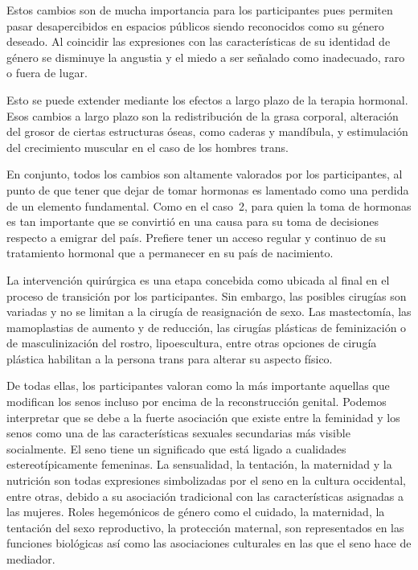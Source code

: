 Estos cambios son de mucha importancia para los participantes pues permiten
pasar desapercibidos en espacios públicos siendo reconocidos como su género
deseado. Al coincidir las expresiones con las características de su identidad de
género se disminuye la angustia y el miedo a ser señalado como inadecuado, raro
o fuera de lugar.

Esto se puede extender mediante los efectos a largo plazo de la terapia
hormonal. Esos cambios a largo plazo son la redistribución de la grasa corporal,
alteración del grosor de ciertas estructuras óseas, como caderas y mandíbula, y
estimulación del crecimiento muscular en el caso de los hombres trans.

En conjunto, todos los cambios son altamente valorados por los participantes, al
punto de que tener que dejar de tomar hormonas es lamentado como una perdida de
un elemento fundamental. Como en el caso~2, para quien la toma de hormonas es
tan importante que se convirtió en una causa para su toma de decisiones respecto
a emigrar del país. Prefiere tener un acceso regular y continuo de su
tratamiento hormonal que a permanecer en su país de nacimiento.

La intervención quirúrgica es una etapa concebida como ubicada al final en el
proceso de transición por los participantes. Sin embargo, las posibles cirugías
son variadas y no se limitan a la cirugía de reasignación de sexo. Las
mastectomía, las mamoplastias de aumento y de reducción, las cirugías plásticas
de feminización o de masculinización del rostro, lipoescultura, entre otras
opciones de cirugía plástica habilitan a la persona trans para alterar su
aspecto físico.

De todas ellas, los participantes valoran como la más importante aquellas que
modifican los senos incluso por encima de la reconstrucción genital. Podemos
interpretar que se debe a la fuerte asociación que existe entre la feminidad y
los senos como una de las características sexuales secundarias más visible
socialmente. El seno tiene un significado que está ligado a cualidades
estereotípicamente femeninas. La sensualidad, la tentación, la maternidad y la
nutrición son todas expresiones simbolizadas por el seno en la cultura
occidental, entre otras, debido a su asociación tradicional con las
características asignadas a las mujeres. Roles hegemónicos de género como el
cuidado, la maternidad, la tentación del sexo reproductivo, la protección
maternal, son representados en las funciones biológicas así como las
asociaciones culturales en las que el seno hace de mediador.

